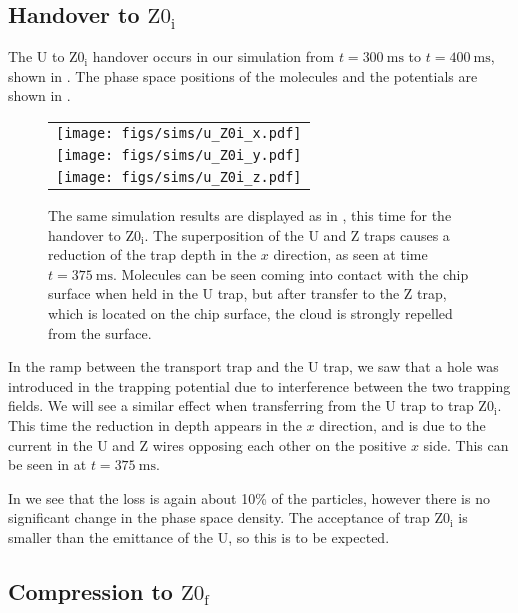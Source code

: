 \subsection{Handover to $\mathrm{Z0_i}$}
\label{design:sim:U_to_Z0i}

The U to $\mathrm{Z0_i}$ handover occurs in our simulation from
$t=\SI{300}{\milli\second}$ to $t=\SI{400}{\milli\second}$, shown in
.  The phase space positions of the
molecules and the potentials are shown in .

\begin{figure}[p]
\centering
  \begin{tabular}{c}
    \texttt{[image: figs/sims/u\_Z0i\_x.pdf]} \\
    \texttt{[image: figs/sims/u\_Z0i\_y.pdf]} \\
    \texttt{[image: figs/sims/u\_Z0i\_z.pdf]}
  \end{tabular}
  \caption{
    The same simulation results are displayed as in
    , this time for the handover to $\mathrm{Z0_i}$.
    The superposition of the U and Z traps causes a reduction of the trap depth
    in the $x$ direction, as seen at time $t=\SI{375}{\milli\second}$.
    Molecules can be seen coming into contact with the chip surface when held
    in the U trap, but after transfer to the Z trap, which is located on the
    chip surface, the cloud is strongly repelled from the surface.
  }
  \label{design:fig:U_Z0i}
\end{figure}

In the ramp between the transport trap and the U trap, we saw that a hole was
introduced in the trapping potential due to interference between the two
trapping fields. We will see a similar effect when transferring from the U trap
to trap $\mathrm{Z0_i}$.  This time the reduction in depth appears in the $x$
direction, and is due to the current in the U and Z wires opposing each other
on the positive $x$ side. This can be seen in  at
$t=\SI{375}{\milli\second}$.

In  we see that the loss is again about 10\% of
the particles, however there is no significant change in the phase space
density. The acceptance of trap $\mathrm{Z0_i}$ is smaller than the emittance
of the U, so this is to be expected.

\subsection{Compression to $\mathrm{Z0_f}$}

